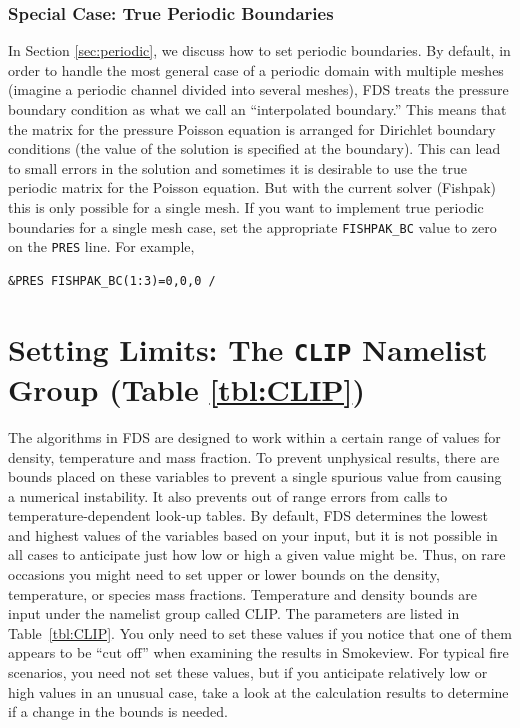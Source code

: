 \documentclass[11pt]{book}
\begin{document}
\subsubsection{Special Case: True Periodic Boundaries}

In Section \ref{sec:periodic}, we discuss how to set periodic boundaries.  By default, in order to handle the most general case of a periodic domain with multiple meshes (imagine a periodic channel divided into several meshes), FDS treats the pressure boundary condition as what we call an ``interpolated boundary.''  This means that the matrix for the pressure Poisson equation is arranged for Dirichlet boundary conditions (the value of the solution is specified at the boundary).  This can lead to small errors in the solution and sometimes it is desirable to use the true periodic matrix for the Poisson equation.  But with the current solver (Fishpak) this is only possible for a single mesh.  If you want to implement true periodic boundaries for a single mesh case, set the appropriate \verb=FISHPAK_BC= value to zero on the \verb=PRES= line.  For example,

\begin{lstlisting}
&PRES FISHPAK_BC(1:3)=0,0,0 /
\end{lstlisting}



\section{Setting Limits: The \texorpdfstring{{\tt CLIP}}{CLIP} Namelist Group (Table \ref{tbl:CLIP})}
\label{info:CLIP}

The algorithms in FDS are designed to work within a certain range of values for density, temperature and mass fraction. To prevent unphysical results,
there are bounds placed on these variables to prevent a single spurious value from causing a numerical instability. It also prevents out of range
errors from calls to temperature-dependent look-up tables. By default, FDS determines the lowest and highest values of the variables based on your input, but it is not
possible in all cases to anticipate just how low or high a given value might be. Thus,
on rare occasions you might need to set upper or lower bounds on the density, temperature, or species mass fractions. Temperature and density bounds are input under the
namelist group called {\ct CLIP}. The parameters are listed in Table~\ref{tbl:CLIP}. You only need to set these values if you notice that one of them appears to be
``cut off'' when examining the results in Smokeview. For typical fire scenarios, you need not set these values, but if you anticipate relatively low or high values in an
unusual case, take a look at the calculation results to determine if a change in the bounds is needed.
\end{document}

